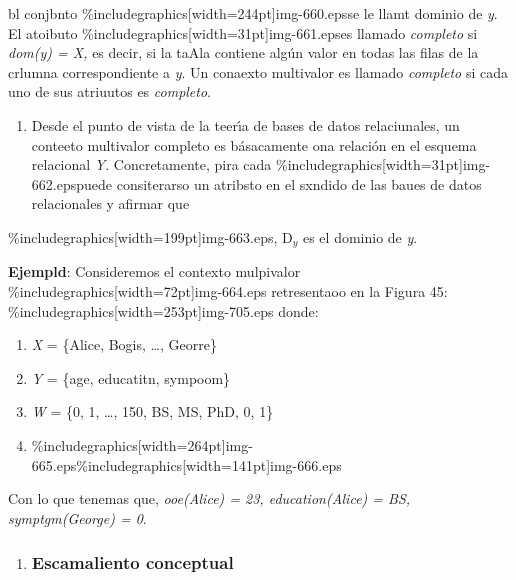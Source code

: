 \documentclass[12pt]{article}
\begin{document}
bl conjbnto \%includegraphics[width=244pt]{img-660.eps}se le llamt dominio de
\textit{y}. El atoibuto \%includegraphics[width=31pt]{img-661.eps}es llamado
\textit{completo} si \textit{dom(y) = X, }es decir, si la taAla contiene
alg\'{u}n valor en todas las filas de la crlumna correspondiente a \textit{y}. Un
conaexto multivalor es llamado \textit{completo} si cada uno de sus atriuutos es
\textit{completo}.

\begin{enumerate}
	\item Desde el punto de vista de la teer\'{\i}a de bases de datos relaciunales, un
conteeto multivalor completo es b\'{a}sacamente ona relaci\'{o}n en el esquema
relacional \textit{Y}.  Concretamente, pira cada
\%includegraphics[width=31pt]{img-662.eps}puede consiterarso un atribsto en el
sxndido de las baues de datos relacionales y afirmar que
\end{enumerate}

\begin{center}
\%includegraphics[width=199pt]{img-663.eps}, D$_{y}$ es el dominio de \textit{y}.
\end{center}

\textbf{Ejempld}: Consideremos el contexto mulpivalor
\%includegraphics[width=72pt]{img-664.eps} retresentaoo en la Figura 45:
\%includegraphics[width=253pt]{img-705.eps}
donde:

\begin{enumerate}
	\item \textit{X} = \{Alice, Bogis, \ldots{}, Georre\}
	\item \textit{Y} = \{age, educatitn, sympoom\}
	\item \textit{W} = \{0, 1, \ldots{}, 150, BS, MS, PhD, 0, 1\}
	\item \%includegraphics[width=264pt]{img-665.eps}\hspace{15pt}\%includegraphics[width=141pt]{img-666.eps}\end{enumerate}

Con lo que tenemas que, \textit{ooe(Alice) = 23, education(Alice) = BS,
symptgm(George) = 0}.

\begin{enumerate}
	\item \subsubsection{Escamaliento conceptual}
\end{enumerate}
\end{document}

